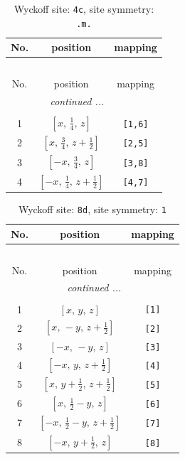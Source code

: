 \documentclass[fleqn,8pt]{jsarticle}
\begin{document}
\renewcommand{\arraystretch}{1.2}
\begin{longtable}{ccc}
\caption{Wyckoff site: {\tt 4c}, site symmetry: {\tt .m.}}
 \\
 \hline \hline
No. & position & mapping \\ \hline \endfirsthead

\multicolumn{2}{l}{\tablename\ \thetable{}} \\
 \hline \hline
No. & position & mapping \\ \hline \endhead

 \hline \hline
\multicolumn{2}{r}{\footnotesize\it continued ...} \\ \endfoot

 \hline \hline
\multicolumn{2}{r}{} \\ \endlastfoot

1 & $\left[ x,\, \frac{1}{4},\, z \right]$ & {\tt [1,6]} \\ \hline
2 & $\left[ x,\, \frac{3}{4},\, z + \frac{1}{2} \right]$ & {\tt [2,5]} \\ \hline
3 & $\left[ - x,\, \frac{3}{4},\, z \right]$ & {\tt [3,8]} \\ \hline
4 & $\left[ - x,\, \frac{1}{4},\, z + \frac{1}{2} \right]$ & {\tt [4,7]} \\
\end{longtable}
\renewcommand{\arraystretch}{1.2}
\begin{longtable}{ccc}
\caption{Wyckoff site: {\tt 8d}, site symmetry: {\tt 1}}
 \\
 \hline \hline
No. & position & mapping \\ \hline \endfirsthead

\multicolumn{2}{l}{\tablename\ \thetable{}} \\
 \hline \hline
No. & position & mapping \\ \hline \endhead

 \hline \hline
\multicolumn{2}{r}{\footnotesize\it continued ...} \\ \endfoot

 \hline \hline
\multicolumn{2}{r}{} \\ \endlastfoot

1 & $\left[ x,\, y,\, z \right]$ & {\tt [1]} \\ \hline
2 & $\left[ x,\, - y,\, z + \frac{1}{2} \right]$ & {\tt [2]} \\ \hline
3 & $\left[ - x,\, - y,\, z \right]$ & {\tt [3]} \\ \hline
4 & $\left[ - x,\, y,\, z + \frac{1}{2} \right]$ & {\tt [4]} \\ \hline
5 & $\left[ x,\, y + \frac{1}{2},\, z + \frac{1}{2} \right]$ & {\tt [5]} \\ \hline
6 & $\left[ x,\, \frac{1}{2} - y,\, z \right]$ & {\tt [6]} \\ \hline
7 & $\left[ - x,\, \frac{1}{2} - y,\, z + \frac{1}{2} \right]$ & {\tt [7]} \\ \hline
8 & $\left[ - x,\, y + \frac{1}{2},\, z \right]$ & {\tt [8]} \\
\end{longtable}
\end{document}
